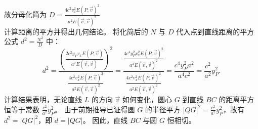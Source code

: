 \begin{solution}
故分母化简为 $D = \frac{4 c^2 v_x^2 E(P, \vec{v})^2}{a^2 E(\vec{v}, \vec{v})^2}$\\
计算距离的平方并得出几何结论。
将化简后的 $N$ 与 $D$ 代入点到直线距离的平方公式 $d^2 = \frac{N^2}{D}$ 中：
\[
d^2 = \frac{ \left( \frac{2 c^2 y_P v_x E(P, \vec{v})}{a^2 E(\vec{v}, \vec{v})} \right)^2 }{ \frac{4 c^2 v_x^2 E(P, \vec{v})^2}{a^2 E(\vec{v}, \vec{v})^2} } = \frac{ \frac{4 c^4 y_P^2 v_x^2 E(P, \vec{v})^2}{a^4 E(\vec{v}, \vec{v})^2} }{ \frac{4 c^2 v_x^2 E(P, \vec{v})^2}{a^2 E(\vec{v}, \vec{v})^2} } = \frac{c^4 y_P^2 a^2}{a^4 c^2} = \frac{c^2}{a^2} y_P^2.
\]
计算结果表明，无论直线 $L$ 的方向 $\vec{v}$ 如何变化，圆心 $G$ 到直线 $BC$ 的距离平方恒等于常数 $\frac{c^2}{a^2} y_P^2$。
由于前期推导已证得圆 $G$ 的半径平方 $|QG|^2 = \frac{c^2}{a^2} y_P^2$，故有 $d^2 = |QG|^2$，即 $d = |QG|$。
因此，直线 $BC$ 与圆 $G$ 恒相切。
\end{solution}


